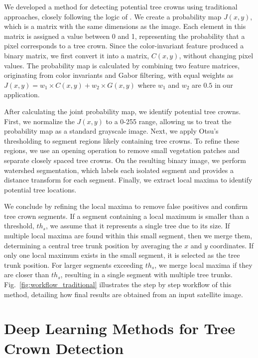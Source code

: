 \documentclass{article}
\begin{document}
We developed a method for detecting potential tree crowns using traditional approaches, closely following the logic of \cite{ozcan_abdullah}. We create a probability map $J(x,y)$, which is a matrix with the same dimensions as the image. Each element in this matrix is assigned a value between 0 and 1, representing the probability that a pixel corresponds to a tree crown. Since the color-invariant feature produced a binary matrix, we first convert it into a matrix, $C(x,y)$, without changing pixel values. The probability map is calculated by combining two feature matrices, originating from color invariants and Gabor filtering, with equal weights as $J(x,y) = w_1 \times C(x,y) + w_2 \times G(x,y)$ where $w_1$ and $w_2$ are $0.5$ in our application. 

After calculating the joint probability map, we identify potential tree crowns. First, we normalize the $J(x,y)$ to a 0-255 range, allowing us to treat the probability map as a standard grayscale image. Next, we apply Otsu's thresholding to segment regions likely containing tree crowns. To refine these regions, we use an opening operation to remove small vegetation patches and separate closely spaced tree crowns. On the resulting binary image, we perform watershed segmentation, which labels each isolated segment and provides a distance transform for each segment. Finally, we extract local maxima to identify potential tree locations.

We conclude by refining the local maxima to remove false positives and confirm tree crown segments. If a segment containing a local maximum is smaller than a threshold, $th_s$, we assume that it represents a single tree due to its size. If multiple local maxima are found within this small segment, then we merge them, determining a central tree trunk position by averaging the  $x$ and $y$ coordinates. If only one local maximum exists in the small segment, it is selected as the tree trunk position. For larger segments exceeding $th_s$, we merge local maxima if they are closer than $th_s$, resulting in a single segment with multiple tree trunks. Fig.~\ref{fig:workflow_traditional} illustrates the step by step workflow of this method, detailing how final results are obtained from an input satellite image.

\section{Deep Learning Methods for Tree Crown Detection}\label{sec:deep_learning_models}
\end{document}
